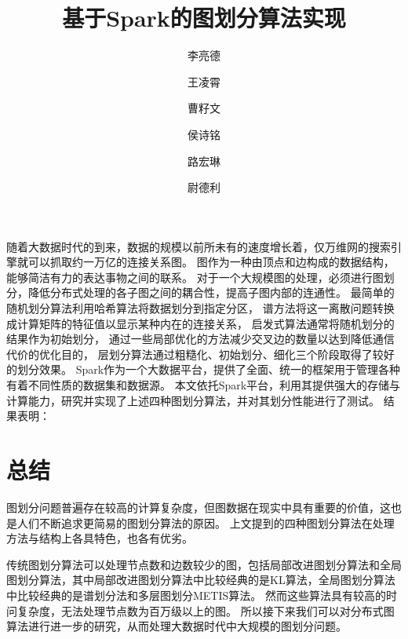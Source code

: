 \documentclass[UTF8,12pt]{ctexart} %
\theoremstyle{definition}
\begin{document}
\title{基于Spark的图划分算法实现}
\author[1]{李亮德}
\author[1]{王凌霄}
\author[2]{曹籽文}
\author[2]{侯诗铭}
\author[2]{路宏琳}
\author[3]{尉德利}
\renewcommand\Authands{, }

\maketitle

\renewcommand{\abstractname}{}
\begin{onecolabstract}
    随着大数据时代的到来，数据的规模以前所未有的速度增长着，仅万维网的搜索引擎就可以抓取约一万亿的连接关系图。
    图作为一种由顶点和边构成的数据结构，能够简洁有力的表达事物之间的联系。
    对于一个大规模图的处理，必须进行图划分，降低分布式处理的各子图之间的耦合性，提高子图内部的连通性。
    最简单的随机划分算法利用哈希算法将数据划分到指定分区，
    谱方法将这一离散问题转换成计算矩阵的特征值以显示某种内在的连接关系，
    启发式算法通常将随机划分的结果作为初始划分，
    通过一些局部优化的方法减少交叉边的数量以达到降低通信代价的优化目的，
    层划分算法通过粗糙化、初始划分、细化三个阶段取得了较好的划分效果。
    Spark作为一个大数据平台，提供了全面、统一的框架用于管理各种有着不同性质的数据集和数据源。
    本文依托Spark平台，利用其提供强大的存储与计算能力，研究并实现了上述四种图划分算法，并对其划分性能进行了测试。
    结果表明：
\end{onecolabstract}

\newpage
\tableofcontents
\newpage






\section{总结}

图划分问题普遍存在较高的计算复杂度，但图数据在现实中具有重要的价值，这也是人们不断追求更简易的图划分算法的原因。
上文提到的四种图划分算法在处理方法与结构上各具特色，也各有优劣。

传统图划分算法可以处理节点数和边数较少的图，包括局部改进图划分算法和全局图划分算法，其中局部改进图划分算法中比较经典的是KL算法，全局图划分算法中比较经典的是谱划分法和多层图划分METIS算法。
然而这些算法具有较高的时问复杂度，无法处理节点数为百万级以上的图。
所以接下来我们可以对分布式图算法进行进一步的研究，从而处理大数据时代中大规模的图划分问题。
\end{document}

